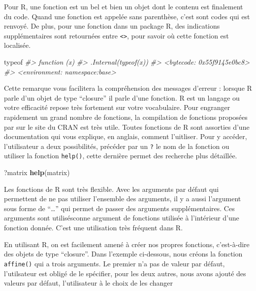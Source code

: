 \documentclass[]{article}
\newenvironment{Shaded}{\begin{snugshade}}{\end{snugshade}}
\newcommand{\CommentTok}[1]{\textcolor[rgb]{0.56,0.35,0.01}{\textit{#1}}}
\newcommand{\KeywordTok}[1]{\textcolor[rgb]{0.13,0.29,0.53}{\textbf{#1}}}
\newcommand{\NormalTok}[1]{#1}
\begin{document}
Pour R, une fonction est un bel et bien un objet dont le contenu est finalement du code. Quand une fonction est appelée sans parenthèse, c'est sont codes qui est renvoyé. De plus, pour une fonction dans un package R, des indications supplémentaires sont retournées entre \texttt{<>}, pour savoir où cette fonction est localisée.

\begin{Shaded}
\begin{Highlighting}[]
\NormalTok{typeof}
\CommentTok{#> function (x) }
\CommentTok{#> .Internal(typeof(x))}
\CommentTok{#> <bytecode: 0x55f9145e0bc8>}
\CommentTok{#> <environment: namespace:base>}
\end{Highlighting}
\end{Shaded}

Cette remarque vous facilitera la compréhension des messages d'erreur : lorsque R parle d'un objet de type ``closure'' il parle d'une fonction. R est un langage ou votre efficacité repose très fortement sur votre vocabulaire. Pour engranger rapidement un grand nombre de fonctions, la compilation de fonctions proposées par sur le site du CRAN est très utile. Toutes fonctions de R sont assorties d'une documentation qui vous explique, en anglais, comment l'uitliser. Pour y accéder, l'utilisateur a deux possibilités, précéder par un \texttt{?} le nom de la fonction ou utiliser la fonction \texttt{help()}, cette dernière permet des recherche plus détaillée.

\begin{Shaded}
\begin{Highlighting}[]
\NormalTok{?matrix}
\KeywordTok{help}\NormalTok{(matrix)}
\end{Highlighting}
\end{Shaded}

Les fonctions de R sont très flexible. Avec les arguments par défaut qui permettent de ne pas utiliser l'ensemble des arguments, il y a aussi l'argument sous forme de ``\ldots{}'' qui permet de passer des arguments supplémentaires. Ces arguments sont utilisésconne argument de fonctions utilisée à l'intérieur d'une fonction donnée. C'est une utilisation très fréquent dans R.

En utilisant R, on est facilement amené à créer nos propres fonctions, c'est-à-dire des objets de type ``closure''. Dans l'exemple ci-dessous, nous créons la fonction \texttt{affine()} qui a trois arguments. Le premier n'a pas de valeur par défaut, l'utilsateur est obligé de le spécifier, pour les deux autres, nous avons ajouté des valeurs par défaut, l'utilisateur à le choix de les changer
\end{document}
